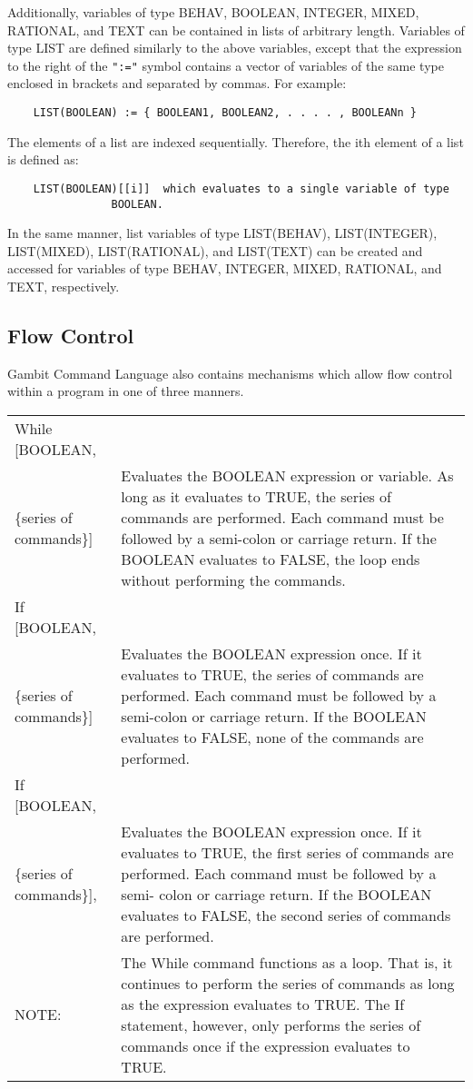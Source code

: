 \medskip

\noindent
Additionally, variables of type  BEHAV, BOOLEAN, INTEGER, MIXED, RATIONAL, and 
TEXT can be contained in lists of arbitrary length.  Variables of type LIST are
defined similarly to the above variables, except that the expression to the 
right of the {\tt ":="} symbol contains a vector of variables of the same 
type enclosed in brackets and separated by commas.  For example:

\begin{verbatim}
	LIST(BOOLEAN) := { BOOLEAN1, BOOLEAN2, . . . . , BOOLEANn }
\end{verbatim}

The elements of a list are indexed sequentially.  Therefore, the ith element of
a list is defined as:

\begin{verbatim}
	LIST(BOOLEAN)[[i]]	which evaluates to a single variable of type 
				BOOLEAN.
\end{verbatim}

\noindent
In the same manner, list variables of type LIST(BEHAV), LIST(INTEGER), 
LIST(MIXED), LIST(RATIONAL), and LIST(TEXT) can be created and accessed for 
variables of type BEHAV, INTEGER, MIXED, RATIONAL, and TEXT, respectively.

\subsection*{Flow Control}

Gambit Command Language also contains mechanisms which allow flow control 
within a program in one of three manners.

\medskip

\begin{tabular}{lp{4in}}
While [BOOLEAN, &\\
\{series of commands\}] & Evaluates the BOOLEAN
expression or variable.  As long as it evaluates to TRUE, the series
of commands are performed.  Each command must be followed by a
semi-colon or carriage return.  If the BOOLEAN evaluates to FALSE, the
loop ends without performing the commands.\\
If [BOOLEAN, & \\
\{series of commands\}] & Evaluates the BOOLEAN expression
once. If it evaluates to TRUE, the series of commands are performed.
Each command must be followed by a semi-colon or carriage return.  If
the BOOLEAN evaluates to FALSE, none of the commands are performed.\\
If [BOOLEAN, & \\
\{series of commands\}], & Evaluates the BOOLEAN expression
once. If it evaluates to TRUE, the first series of commands are
performed.  Each command must be followed by a semi-
colon or carriage return.  If the BOOLEAN evaluates to FALSE, the second
series of commands are performed. \\
NOTE: & The While command functions as a loop.  That is, it continues
to perform the series of commands as long as the expression
evaluates to TRUE.  The If statement, however, only performs the
series of commands once if the expression evaluates to TRUE.
\end{tabular}

